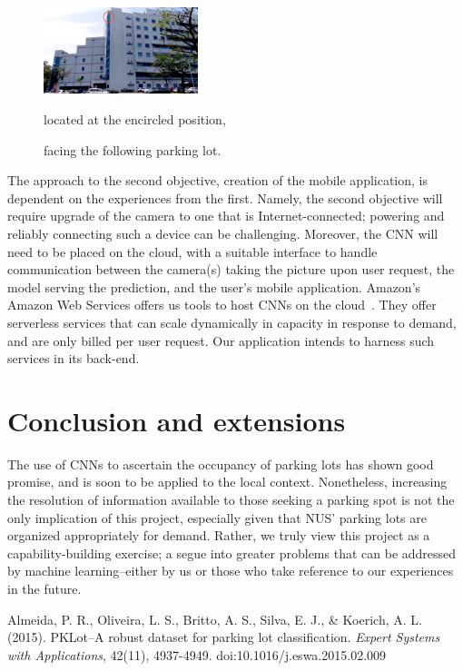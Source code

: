 \documentclass[a4paper, 11pt]{article} %
\begin{document}
		\begin{figure}[h]
			\centering
			\includegraphics[width=0.4\textwidth]{figures/context2_used.jpg}
			\caption{located at the encircled position,}
			\vskip 5mm
		    \caption{facing the following parking lot.}
		\end{figure}
		\newpage
		The approach to the second objective, creation of the mobile application, is dependent on the 
		experiences from the first. Namely, the second objective will require upgrade of the camera to one 
		that is Internet-connected; powering and reliably connecting such a device can be challenging. 
		Moreover, the CNN will need to be placed on the cloud, with a suitable interface to handle 
		communication between the camera(s) taking the picture upon user request, the model serving 
		the prediction, and the user's mobile application. Amazon's Amazon Web Services offers us tools 
		to host CNNs on the cloud~\cite{aws}\relax. They offer serverless services that can scale 
		dynamically in capacity in response to demand, and are only billed per user request. Our 
		application intends to harness such services in its back-end.
		
\section{Conclusion and extensions}
	The use of CNNs to ascertain the occupancy of parking lots has shown good promise, and is soon 
	to be applied to the local context. Nonetheless, increasing the resolution of information available to 
	those seeking a parking spot is not the only implication of this project, especially given that NUS' 
	parking lots are organized appropriately for demand. Rather, we truly view this project as a 
	capability-building exercise; a segue into greater problems that can be addressed by machine 
	learning--either by us or those who take reference to our experiences in the future.

\begin{thebibliography}{unsrt}
		Almeida, P. R., Oliveira, L. S., Britto, A. S., Silva, E. J., \& Koerich, A. L. (2015). PKLot--A robust 
		dataset for parking lot classification. \textit{Expert Systems with Applications}, 42(11), 
		4937-4949. doi:10.1016/j.eswa.2015.02.009
\end{thebibliography}
\end{document}
